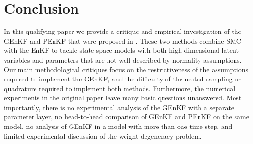 \documentclass[12pt]{article}
\begin{document}





\section{Conclusion}
In this qualifying paper we provide a critique and empirical investigation of the
GEnKF and PEnKF that were proposed in \cite{katzfuss2020}. These two methods combine
SMC with the EnKF to tackle state-space models with
both high-dimensional latent variables and parameters that are not well
described by normality assumptions. Our main methodological critiques focus on
the restrictiveness of the assumptions required to implement the GEnKF, and the
difficulty of the nested sampling or quadrature required to implement both
methods. Furthermore, the numerical experiments in the original paper
\cite{katzfuss2020} leave many basic questions unanswered. Most importantly,
there is no experimental analysis of the GEnKF with a separate parameter layer,
no head-to-head comparison of GEnKF and PEnKF on the same model, no analysis
of GEnKF in a model with more than one time step, and limited experimental
discussion of the weight-degeneracy problem.
\end{document}
